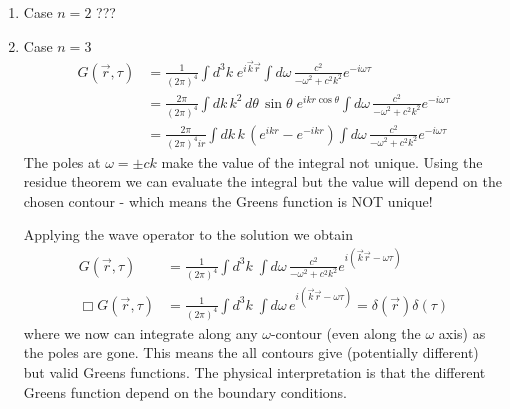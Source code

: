 \documentclass[../main.tex]{subfiles}
\begin{document}
\begin{itemize}
\begin{enumerate}
\item Case $n=2$
???

\item Case $n=3$
\begin{align}
G(\vec{r},\tau)
&=\frac{1}{(2\pi)^4}\int d^3k\;e^{i\vec{k}\vec{r}} \int d\omega\,\frac{c^2}{-\omega^2+c^2k^2}e^{-i\omega\tau}\\
&=\frac{2\pi}{(2\pi)^4}\int dk\,k^2\,d\theta\,\sin\theta\;e^{ikr\cos\theta} \int d\omega\,\frac{c^2}{-\omega^2+c^2k^2}e^{-i\omega\tau}\\
&=\frac{2\pi}{(2\pi)^4ir}\int dk\,k\,(e^{ikr}-e^{-ikr}) \int d\omega\,\frac{c^2}{-\omega^2+c^2k^2}e^{-i\omega\tau}
\end{align}
The poles at $\omega=\pm ck$ make the value of the integral not  
unique. Using the residue theorem we can evaluate the integral but the value will depend on the chosen contour - which means the Greens function is NOT unique!

Applying the wave operator to the solution we obtain 
\begin{align}
G(\vec{r},\tau)&=\frac{1}{(2\pi)^4}\int d^3k\;\int d\omega\,\frac{c^2}{-\omega^2+c^2k^2}e^{i(\vec{k}\vec{r}-\omega\tau)}\\
\Box G(\vec{r},\tau)&=\frac{1}{(2\pi)^4}\int d^3k\;\int d\omega\,e^{i(\vec{k}\vec{r}-\omega\tau)}=\delta(\vec{r})\delta(\tau)
\end{align}
where we now can integrate along any $\omega$-contour (even along the $\omega$ axis) as the poles are gone. This means the all contours give (potentially different) but valid Greens functions. The physical interpretation is that the different Greens function depend on the boundary conditions.


\end{enumerate}
\end{itemize}
\end{document}
